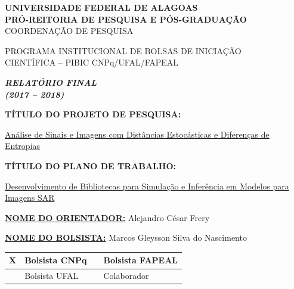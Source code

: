 \documentclass[12pt,letterpaper]{article}
\begin{document}
\onehalfspacing 
\thispagestyle{empty}

\begin{center}
\vspace{0.2cm}

\hrulefill

\textbf{UNIVERSIDADE FEDERAL DE ALAGOAS}\\
\textbf{PRÓ-REITORIA DE PESQUISA E PÓS-GRADUAÇÃO}\\
COORDENAÇÃO DE PESQUISA

\hrulefill

\vspace{0.5cm}

PROGRAMA INSTITUCIONAL DE BOLSAS DE INICIAÇÃO\\ CIENTÍFICA -- PIBIC CNPq/UFAL/FAPEAL

\vspace{1.0cm}

\textbf{\textit{\Large{RELATÓRIO FINAL \\ (2017 -- 2018)}}}\\

\vspace{1.2cm}

\textbf{TÍTULO DO PROJETO DE PESQUISA:}

\underline{Análise de Sinais e Imagens com Distâncias Estocásticas e Diferenças de Entropias}

\vspace{0.6cm}

\textbf{TÍTULO DO PLANO DE TRABALHO:}

\underline{Desenvolvimento de Bibliotecas para Simulação e Inferência em Modelos para Imagens SAR}

\end{center}

\textbf{\underline{NOME DO ORIENTADOR:}} Alejandro César Frery 

\vspace{0.4cm}

\textbf{\underline{NOME DO BOLSISTA:}} Marcos Gleysson Silva do Nascimento

\vspace{1cm}

\begin{table}[!h]
\begin{center}
\begin{tabularx}{\textwidth}{|X|X|X|X|}
\hline                              
\hspace{1.3cm} X & Bolsista CNPq &  &Bolsista FAPEAL\\
\hline             
& Bolsista UFAL &  &Colaborador\\
\hline     
\end{tabularx}
\end{center}
\end{table}
\end{document}
